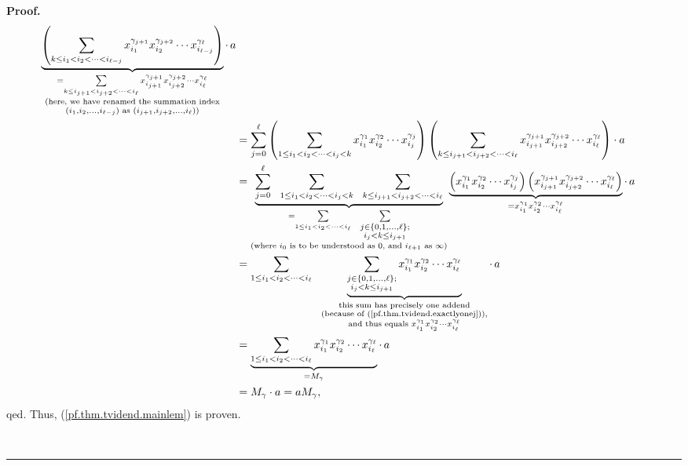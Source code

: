 \documentclass[numbers=enddot,12pt,final,onecolumn,notitlepage,abstracton]{scrartcl}%
\theoremstyle{definition}
\newenvironment{proof}[1][Proof]{\noindent\textbf{#1.} }{\ \rule{0.5em}{0.5em}}
\newenvironment{verlong}{}{}
\let\sumnonlimits\sum
\renewcommand{\sum}{\sumnonlimits\limits}
\begin{document}
\begin{verlong}
\begin{proof}
\begin{align*}
\underbrace{\left(  \sum_{k\leq i_{1}<i_{2}<\cdots<i_{\ell-j}}x_{i_{1}%
}^{\gamma_{j+1}}x_{i_{2}}^{\gamma_{j+2}}\cdots x_{i_{\ell-j}}^{\gamma_{\ell}%
}\right)  }_{\substack{=\sum_{k\leq i_{j+1}<i_{j+2}<\cdots<i_{\ell}}%
x_{i_{j+1}}^{\gamma_{j+1}}x_{i_{j+2}}^{\gamma_{j+2}}\cdots x_{i_{\ell}%
}^{\gamma_{\ell}}\\\text{(here, we have renamed the summation index}\\\left(
i_{1},i_{2},\ldots,i_{\ell-j}\right)  \text{ as }\left(  i_{j+1}%
,i_{j+2},\ldots,i_{\ell}\right)  \text{)}}}\cdot\,a\\
&  =\sum_{j=0}^{\ell}\left(  \sum_{1\leq i_{1}<i_{2}<\cdots<i_{j}<k}x_{i_{1}%
}^{\gamma_{1}}x_{i_{2}}^{\gamma_{2}}\cdots x_{i_{j}}^{\gamma_{j}}\right)
\left(  \sum_{k\leq i_{j+1}<i_{j+2}<\cdots<i_{\ell}}x_{i_{j+1}}^{\gamma_{j+1}%
}x_{i_{j+2}}^{\gamma_{j+2}}\cdots x_{i_{\ell}}^{\gamma_{\ell}}\right)  \cdot
a\\
&  =\underbrace{\sum_{j=0}^{\ell}\ \ \sum_{1\leq i_{1}<i_{2}<\cdots<i_{j}%
<k}\ \ \sum_{k\leq i_{j+1}<i_{j+2}<\cdots<i_{\ell}}}_{\substack{=\sum_{1\leq
i_{1}<i_{2}<\cdots<i_{\ell}}\ \ \sum_{\substack{j\in\left\{  0,1,\ldots
,\ell\right\}  ;\\i_{j}<k\leq i_{j+1}}}\\\text{(where }i_{0}\text{ is to be
understood as }0\text{, and }i_{\ell+1}\text{ as }\infty\text{)}%
}}\underbrace{\left(  x_{i_{1}}^{\gamma_{1}}x_{i_{2}}^{\gamma_{2}}\cdots
x_{i_{j}}^{\gamma_{j}}\right)  \left(  x_{i_{j+1}}^{\gamma_{j+1}}x_{i_{j+2}%
}^{\gamma_{j+2}}\cdots x_{i_{\ell}}^{\gamma_{\ell}}\right)  }_{=x_{i_{1}%
}^{\gamma_{1}}x_{i_{2}}^{\gamma_{2}}\cdots x_{i_{\ell}}^{\gamma_{\ell}}}%
\cdot\,a\\
&  =\sum_{1\leq i_{1}<i_{2}<\cdots<i_{\ell}}\ \ \underbrace{\sum
_{\substack{j\in\left\{  0,1,\ldots,\ell\right\}  ;\\i_{j}<k\leq i_{j+1}%
}}x_{i_{1}}^{\gamma_{1}}x_{i_{2}}^{\gamma_{2}}\cdots x_{i_{\ell}}%
^{\gamma_{\ell}}}_{\substack{\text{this sum has precisely one addend}%
\\\text{(because of (\ref{pf.thm.tvidend.exactlyonej})),}\\\text{and thus
equals }x_{i_{1}}^{\gamma_{1}}x_{i_{2}}^{\gamma_{2}}\cdots x_{i_{\ell}%
}^{\gamma_{\ell}}}}\cdot\,a\\
&  =\underbrace{\sum_{1\leq i_{1}<i_{2}<\cdots<i_{\ell}}x_{i_{1}}^{\gamma_{1}%
}x_{i_{2}}^{\gamma_{2}}\cdots x_{i_{\ell}}^{\gamma_{\ell}}}_{=M_{\gamma}}%
\cdot\,a\\
&  =M_{\gamma}\cdot a=aM_{\gamma},
\end{align*}
qed. Thus, (\ref{pf.thm.tvidend.mainlem}) is proven.


\end{proof}
\end{verlong}
\end{document}
